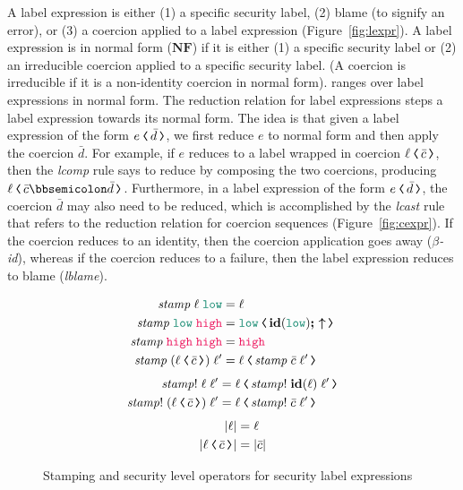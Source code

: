A label expression is either (1) a specific security label, (2) blame (to
signify an error), or (3) a coercion applied to a label expression
(Figure~\ref{fig:lexpr}).
%
A label expression is in normal form ($\mathbf{NF}$) if it is either (1) a
specific security label or (2) an irreducible coercion applied to a specific
security label. (A coercion is irreducible if it is a non-identity coercion in
normal form). \PC ranges over label expressions in normal form.
%
The reduction relation for label expressions steps a label expression towards
its normal form. The idea is that given a label expression of the form
$\cccast{e}{\bar{d}}$, we first reduce $e$ to normal form and then apply the
coercion $\bar{d}$. For example, if $e$ reduces to a label wrapped in coercion
$\cccast{\ell}{\bar{c}}$, then the \textit{lcomp} rule says to reduce by
composing the two coercions, producing $\cccast{\ell}{\bar{c} \mdoubleplus
  \bar{d}}$. Furthermore, in a label expression of the form
$\cccast{e}{\bar{d}}$, the coercion $\bar{d}$ may also need to be reduced, which
is accomplished by the \textit{lcast} rule that refers to the reduction relation
for coercion sequences (Figure~\ref{fig:cexpr}). If the coercion reduces to an
identity, then the coercion application goes away ($\beta$\textit{-id}), whereas
if the coercion reduces to a failure, then the label expression reduces to blame
(\textit{lblame}).

\begin{figure}[tbp]
  \raggedright
       {\small
         \begin{align*}
           \mathit{stamp} \; \ell \; \low &= \ell \\
           \mathit{stamp} \; \low \; \high &= \cccast{\low}{\id{\low}\seq\up} \\
           \mathit{stamp} \; \high \; \high &= \high \\
           \mathit{stamp} \; (\cccast{\ell}{\bar{c}}) \; \ell' &= \cccast{\ell}{\mathit{stamp} \; \bar{c} \; \ell'}
         \end{align*}
       }
       {\small
         \begin{align*}
           \mathit{stamp!} \; \ell \; \ell' &= \cccast{\ell}{\mathit{stamp!}\;\id{\ell}\;\ell'} \\
           \mathit{stamp!} \; (\cccast{\ell}{\bar{c}}) \; \ell' &= \cccast{\ell}{\mathit{stamp!} \; \bar{c} \; \ell'}
         \end{align*}
       }
       {\small
         \begin{align*}
           | \ell | &= \ell \\
           | \cccast{\ell}{\bar{c}} | &= | \bar{c} |
         \end{align*}
       }
  \caption{Stamping and security level operators for security label expressions}
  \label{fig:stamp-lval}
\end{figure}

